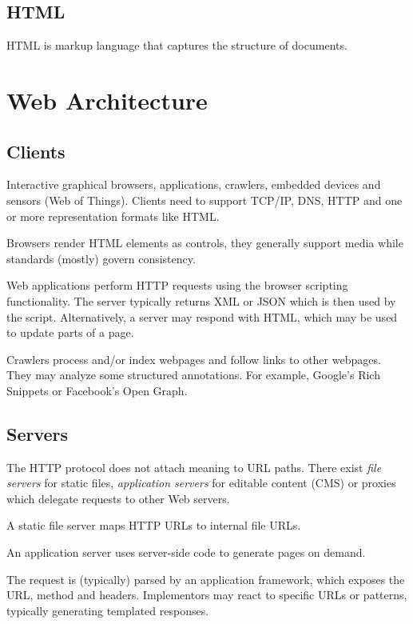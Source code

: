 \documentclass{report}
\begin{document}
\subsection{HTML}

HTML is markup language that captures the structure of documents.

\section{Web Architecture}

\subsection{Clients}

Interactive graphical browsers, applications, crawlers,
embedded devices and sensors (Web of Things).
Clients need to support TCP/IP, DNS, HTTP
and one or more representation formats like HTML.

Browsers render HTML elements as controls,
they generally support media
while standards (mostly) govern consistency.

Web applications perform HTTP requests
using the browser scripting functionality.
The server typically returns XML or JSON
which is then used by the script.
Alternatively, a server may respond with HTML,
which may be used to update parts of a page.

Crawlers process and/or index webpages
and follow links to other webpages.
They may analyze some structured annotations.
For example, Google's Rich Snippets
or Facebook's Open Graph.

\subsection{Servers}

The HTTP protocol does not attach meaning to URL paths.
There exist \textit{file servers} for static files,
\textit{application servers} for editable content (CMS)
or proxies which delegate requests to other Web servers.

A static file server maps HTTP URLs to internal file URLs.

An application server uses server-side code
to generate pages on demand.

The request is (typically) parsed by an application framework,
which exposes the URL, method and headers.
Implementors may react to specific URLs or patterns,
typically generating templated responses.
\end{document}
